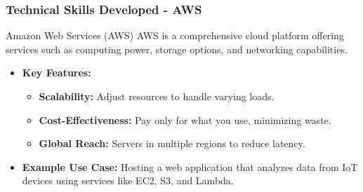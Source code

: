 \documentclass[aspectratio=169]{beamer}
\begin{document}
\begin{frame}[fragile]
    \frametitle{Technical Skills Developed - AWS}
    \begin{block}{Amazon Web Services (AWS)}
        AWS is a comprehensive cloud platform offering services such as computing power, storage options, and networking capabilities.
    \end{block}
    \begin{itemize}
        \item \textbf{Key Features:}
            \begin{itemize}
                \item \textbf{Scalability:} Adjust resources to handle varying loads.
                \item \textbf{Cost-Effectiveness:} Pay only for what you use, minimizing waste.
                \item \textbf{Global Reach:} Servers in multiple regions to reduce latency.
            \end{itemize}
        \item \textbf{Example Use Case:} Hosting a web application that analyzes data from IoT devices using services like EC2, S3, and Lambda.
    \end{itemize}
\end{frame}
\end{document}

